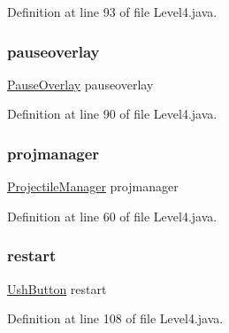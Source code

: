 Definition at line 93 of file Level4.\+java.

\mbox{\label{classscenes_1_1_level4_a544fb9294d892e35b4b0316e07997cd6}} 
\subsubsection{\texorpdfstring{pauseoverlay}{pauseoverlay}}
{\footnotesize\ttfamily \hyperlink{classui_1_1_pause_overlay}{Pause\+Overlay} pauseoverlay\hspace{0.3cm}{\ttfamily [private]}}



Definition at line 90 of file Level4.\+java.

\mbox{\label{classscenes_1_1_level4_aee34cf906685787259a2edd7d4559863}} 
\subsubsection{\texorpdfstring{projmanager}{projmanager}}
{\footnotesize\ttfamily \hyperlink{classmanagers_1_1_projectile_manager}{Projectile\+Manager} projmanager\hspace{0.3cm}{\ttfamily [private]}}



Definition at line 60 of file Level4.\+java.

\mbox{\label{classscenes_1_1_level4_ac1d34384911014e49613ccfb1abddbcc}} 
\subsubsection{\texorpdfstring{restart}{restart}}
{\footnotesize\ttfamily \hyperlink{classui_1_1_ush_button}{Ush\+Button} restart\hspace{0.3cm}{\ttfamily [private]}}



Definition at line 108 of file Level4.\+java.

